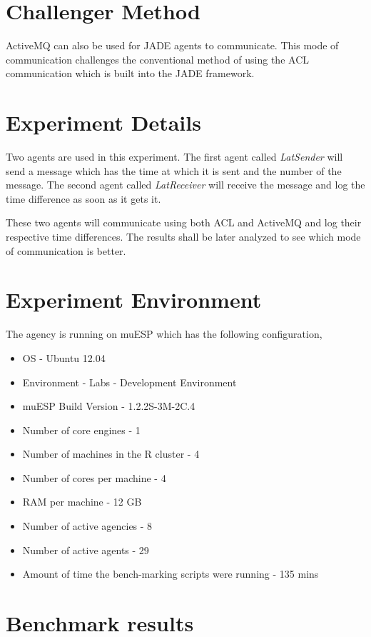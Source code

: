 \documentclass{article}
\begin{document}
\section{Challenger Method}
ActiveMQ can also be used for JADE agents to communicate. This mode of communication challenges the conventional method of using the ACL communication which is built into the JADE framework.

\section{Experiment Details}
Two agents are used in this experiment. The first agent called \emph{LatSender} will send a message which has the time at which it is sent and the number of the message. The second agent called \emph{LatReceiver} will receive the message and log the time difference as soon as it gets it.

These two agents will communicate using both ACL and ActiveMQ and log their respective time differences. The results shall be later analyzed to see which mode of communication is better.

\section{Experiment Environment}
The agency is running on muESP which has the following configuration,
\begin{itemize}
\item OS - Ubuntu 12.04
\item Environment - Labs - Development Environment
\item muESP Build Version - 1.2.2S-3M-2C.4 
\item Number of core engines - 1
\item Number of machines in the R cluster - 4
\item Number of cores per machine - 4
\item RAM per machine - 12 GB
\item Number of active agencies - 8
\item Number of active agents - 29
\item Amount of time the bench-marking scripts were running - 135 mins
\end{itemize}
\clearpage

\section{Benchmark results}
\end{document}
